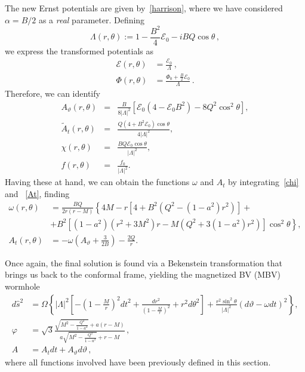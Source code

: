 \documentclass[aps,preprint,groupedaddress,nofootinbib,superscriptaddress,showkeys,showpacs,eqsecnum,amsmath,amssymb]{revtex4-1}
\newcommand{\ernst}{\mathcal{E}}
\begin{document}
The new Ernst potentials are given by~\eqref{harrison}, where we have considered $\alpha=B/2$ as a \emph{real} parameter. Defining 
\begin{equation}
\Lambda(r,\theta) := 1 - \frac{B^2}{4} \mathcal{E}_0-iBQ \cos\theta \,,
\end{equation}
we express the transformed potentials as
\begin{subequations}
\begin{align}
\ernst(r,\theta) &= \frac{\ernst_0}{\Lambda} \,, \\
\Phi(r,\theta) &= \frac{\Phi_0 + \frac{B}{2}\ernst_0}{\Lambda} \,.
\end{align}
\end{subequations}
Therefore, we can identify 
\begin{subequations}\label{eq:NewFunctionsMagnetic}
    \begin{eqnarray}
        A_\vartheta(r, \theta) &=&  \frac{B}{8|\Lambda|^2} \left[ \ernst_0\left( 4-\ernst_0B^2\right) - 8Q^2\cos^2\theta\right],\\
        \tilde{A}_t(r,\theta) &=& \frac{Q(4+B^2\ernst_0)\cos\theta}{4|\Lambda|^2},\\
        \chi(r,\theta) &=& \frac{BQ\ernst_0 \cos\theta}{|\Lambda|^2},\\
        f(r,\theta) &=& \frac{f_0}{|\Lambda|^2}.
    \end{eqnarray}
\end{subequations}
Having these at hand, we can obtain the functions $\omega$ and $A_t$ by integrating~\eqref{chi} and ~\eqref{At}, finding
\begin{subequations}
\begin{align}
 \omega(r, \theta) &= \frac{BQ}{2 r (r - M)} \left\lbrace 4M - r\left[ 4+B^2\left( Q^2 - (1-a^2)r^2\right)\right]\right.+\nonumber \\  
   & + \left.B^2\left[ (1-a^2)(r^2+3M^2)r- M\left( Q^2 +3(1-a^2)r^2\right) \right]\cos^2\theta\right\rbrace,\label{eq:OmegaMagnetized}\\
   A_t(r,\theta)&=-\omega\left( A_\vartheta + \frac{3}{2B}\right)-\frac{2Q}{r}.
\end{align}
\end{subequations}

Once again, the final solution is found via a Bekenstein transformation that brings us back to the conformal frame, yielding the magnetized BV (MBV) wormhole
\begin{subequations}\label{MelvinWH}
\begin{align}
d\hat{s}^2 &= \Omega \left\lbrace
|\Lambda|^2 \left[
-\left(1 - \frac{M}{r}\right)^2 {dt}^2 + \frac{{dr}^2}{\left(1 - \frac{M}{r}\right)^2} + r^2 {d\theta}^2 \right] + \frac{r^2\sin^2\theta}{|\Lambda|^2} \left( d\vartheta - \omega dt \right)^2 \right\rbrace,\\
\varphi &= \sqrt{3}  \frac{\sqrt{M^2 - \frac{Q^2}{1-a^2}} + a(r-M)}{a \sqrt{M^2 - \frac{Q^2}{1-a^2}} + r-M} \,,\\
A &= A_t dt + A_\vartheta d\vartheta \,, 
\end{align}
\end{subequations}
where all functions involved have been previously defined in this section.
\end{document}

